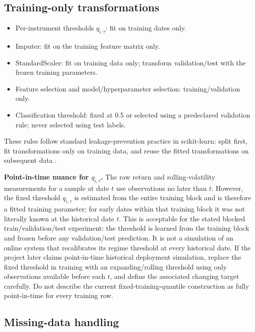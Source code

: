 \documentclass[11pt,a4paper]{article}
\begin{document}
\subsection{Training-only transformations}

\begin{itemize}
  \item Per-instrument thresholds $q_{i,\tau}$: fit on training dates only.
  \item Imputer: fit on the training feature matrix only.
  \item StandardScaler: fit on training data only; transform validation/test with the frozen training parameters.
  \item Feature selection and model/hyperparameter selection: training/validation only.
  \item Classification threshold: fixed at 0.5 or selected using a predeclared validation rule; never selected using test labels.
\end{itemize}

These rules follow standard leakage-prevention practice in scikit-learn: split first, fit transformations only on training data, and reuse the fitted transformations on subsequent data \cite{ScikitLearnPitfalls}.

\begin{warningbox}
\textbf{Point-in-time nuance for $q_{i,\tau}$.} The raw return and rolling-volatility measurements for a sample at date $t$ use observations no later than $t$. However, the fixed threshold $q_{i,\tau}$ is estimated from the entire training block and is therefore a fitted training parameter; for early dates within that training block it was not literally known at the historical date $t$. This is acceptable for the stated blocked train/validation/test experiment: the threshold is learned from the training block and frozen before any validation/test prediction. It is not a simulation of an online system that recalibrates its regime threshold at every historical date. If the project later claims point-in-time historical deployment simulation, replace the fixed threshold in training with an expanding/rolling threshold using only observations available before each $t$, and define the associated changing target carefully. Do not describe the current fixed-training-quantile construction as fully point-in-time for every training row.
\end{warningbox}

\subsection{Missing-data handling}
\end{document}
